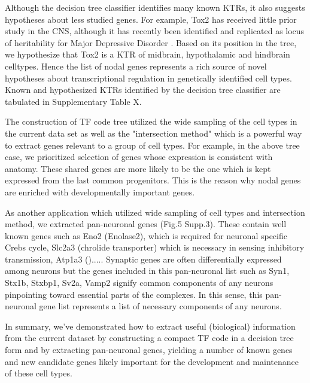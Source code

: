 Although the decision tree classifier identifies many known KTRs, it also suggests hypotheses about less studied genes. For example, Tox2 has received little prior study in the CNS, although it has recently been identified and replicated as locus of heritability for Major Depressive Disorder \cite{Zeng_2016}. Based on its position in the tree, we hypothesize that Tox2 is a KTR of midbrain, hypothalamic and hindbrain celltypes. Hence the list of nodal genes represents a rich source of novel hypotheses about transcriptional regulation in genetically identified cell types. Known and hypothesized KTRs identified by the decision tree classifier are tabulated in Supplementary Table X.

The construction of TF code tree utilized the wide sampling of the cell types in the current data set as well as the "intersection method" which is a powerful way to extract genes relevant to a group of cell types. For example, in the above tree case, we prioritized selection of genes whose expression is consistent with anatomy. These shared genes are more likely to be the one which is kept expressed from the last common progenitors. This is the reason why nodal genes are enriched with developmentally important genes.

As another application which utilized wide sampling of cell types and intersection method, we  extracted pan-neuronal genes (Fig.5 Supp.3). These contain well known genes such as Eno2 (Enolase2), which is required for neuronal specific Crebs cycle, Slc2a3 (chrolide transporter) which is necessary in sensing inhibitory transmission, Atp1a3 ().....  Synaptic genes are often differentially expressed among neurons but the genes included in this pan-neuronal list such as Syn1, Stx1b, Stxbp1, Sv2a, Vamp2 signify common components of any neurons pinpointing toward essential parts of the complexes. In this sense, this pan-neuronal gene list represents a list of necessary components of any neurons.

In summary, we've demonstrated how to extract useful (biological) information from the current dataset by constructing a compact TF code in a decision tree form and by extracting pan-neuronal genes, yielding a number of known genes and new candidate genes likely important for the development and maintenance of these cell types.
